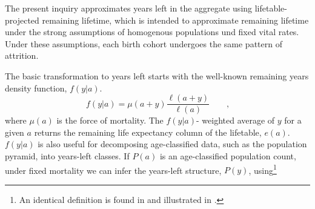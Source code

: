 \documentclass[12pt,oneside,a4paper,leqno]{article}
\newcommand{\ec}{\quad\quad\text{,}}
\begin{document}
The present inquiry approximates years left in the aggregate using
lifetable-projected remaining lifetime, which is intended to approximate remaining lifetime under the strong
assumptions of homogenous populations und fixed vital rates. 
Under these assumptions, each birth cohort undergoes the same
pattern of attrition. %

The basic transformation to years left starts with the well-known remaining
years density function, $f(y|a)$.
\begin{equation}
\label{eq:vaupel1}
f(y | a) = \mu(a+y)\frac{\ell(a+y)}{\ell(a)} \ec
\end{equation}
where $\mu(a)$ is the force of mortality.
The $f(y|a)$- weighted average of $y$ for a given $a$ returns the remaining life
expectancy column of the lifetable, $e(a)$. $f(y|a)$ is also useful for
decomposing age-classified data, such as the
population pyramid, into years-left classes. If $P(a)$ is an
age-classified population count, under fixed mortality we can infer the
years-left structure, $P(y)$, using\footnote{An identical definition is found in
\citet{brouard1989mouvements} and illustrated in \citet{brouard1986structure}.}
\end{document}
